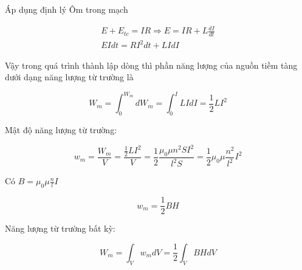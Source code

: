 Áp dụng định lý Ôm trong mạch 

\begin{gather*}
  E + E_{tc} = IR \Rightarrow E = IR + L\frac{dI}{dt} \\
  EIdt = RI^2dt + LIdI
\end{gather*}

Vậy trong quá trình thành lập dòng thì phần năng lượng của nguồn tiềm tàng dưới dạng năng lượng từ trường là

\begin{equation*}
  W_m = \int_{0}^{W_m} dW_m = \int_{0}^{I} LIdI = \frac{1}{2}LI^2
\end{equation*}

Mật độ năng lượng từ trường:

\begin{equation*}
  w_m = \frac{W_m}{V} = \frac{\frac{1}{2}LI^2}{V} = \frac{1}{2} \frac{\mu_0\mu n^2 SI^2}{l^2 S} = \frac{1}{2} \mu_0 \mu \frac{n^2}{l^2} I^2
\end{equation*}

Có $B = \mu_0\mu \frac{n}{l} I$

\begin{equation*}
  w_m = \frac{1}{2} BH
\end{equation*}

Năng lượng từ trường bất kỳ:

\begin{equation*}
  W_m = \int_V w_mdV = \frac{1}{2} \int_V BHdV
\end{equation*}